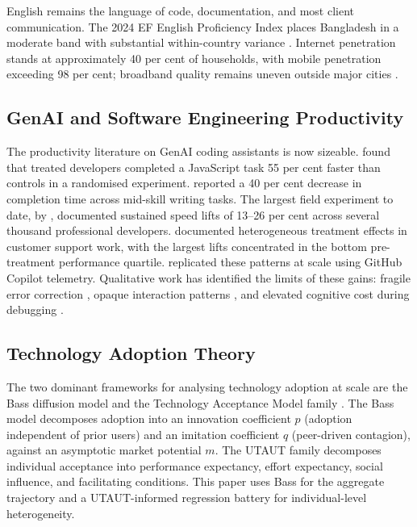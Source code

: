 \documentclass[11pt,a4paper]{article}
\begin{document}
English remains the language of code, documentation, and most client
communication. The 2024 EF English Proficiency Index places Bangladesh
in a moderate band with substantial within-country variance
\citep{EFEPI2024}. Internet penetration stands at approximately
40 per cent of households, with mobile penetration exceeding
98 per cent; broadband quality remains uneven outside major cities
\citep{ITUDigitalDevelopment2025}.

\subsection{GenAI and Software Engineering Productivity}

The productivity literature on GenAI coding assistants is now
sizeable. \citet{PengKalliamvakouEtAl2023} found that treated
developers completed a JavaScript task 55 per cent faster than
controls in a randomised experiment. \citet{NoyZhang2023} reported a
40 per cent decrease in completion time across mid-skill writing
tasks. The largest field experiment to date, by
\citet{CuiDemirerEtAl2025}, documented sustained speed lifts of
13--26 per cent across several thousand professional developers.
\citet{BrynjolfssonLiRaymond2025} documented heterogeneous treatment
effects in customer support work, with the largest lifts concentrated
in the bottom pre-treatment performance quartile.
\citet{ZieglerEtAl2024} replicated these patterns at scale using
GitHub Copilot telemetry. Qualitative work has identified the limits
of these gains: fragile error correction
\citep{Vaithilingam2022,LiangYangMyers2024}, opaque interaction
patterns \citep{BarkeJamesPolikarpova2023}, and elevated cognitive
cost during debugging \citep{MozannarEtAl2024}.

\subsection{Technology Adoption Theory}

The two dominant frameworks for analysing technology adoption at
scale are the Bass diffusion model
\citep{Bass1969,MahajanMullerBass1990,Rogers2003} and the Technology
Acceptance Model family \citep{DavisTAM1989,VenkateshUTAUT2003,
VenkateshUTAUT22012}. The Bass model decomposes adoption into an
innovation coefficient $p$ (adoption independent of prior users)
and an imitation coefficient $q$ (peer-driven contagion), against
an asymptotic market potential $m$. The UTAUT family decomposes
individual acceptance into performance expectancy, effort expectancy,
social influence, and facilitating conditions. This paper uses Bass
for the aggregate trajectory and a UTAUT-informed regression battery
for individual-level heterogeneity.
\end{document}
